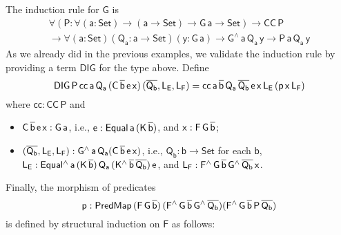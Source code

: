 \documentclass[acmsmall,screen,review,anonymous]{acmart}
\theoremstyle{definition}
\begin{document}
The induction rule for $\mathsf{G}$ is
\begin{multline*}
\mathsf{\forall (P : \forall (a : Set) \to (a \to Set) \to G\,a \to Set) \to CC\,P} \\
\mathsf{\to \forall (a : Set)(Q_a : a \to Set)(y : G\,a) \to G^{\wedge}\,a\,Q_a\,y \to P\,a\,Q_a\,y}
\end{multline*}
As we already did in the previous examples,
we validate the induction rule by providing a term $\mathsf{DIG}$ for the type above.
Define
\[
\mathsf{DIG\,P\,cc\,a\,Q_a\,(C\,\overline{b}\,e\,x)\,(\overline{Q_b}, L_E, L_F)
= cc\,a\,\overline{b}\,Q_a\,\overline{Q_b}\,e\,x\,L_E\,(p\,x\,L_F)}
\]
where $\mathsf{cc : CC\,P}$ and
\begin{itemize}
\item $\mathsf{C\,\overline{b}\,e\,x : G\,a}$,
i.e., $\mathsf{e : Equal\,a\,(K\,\overline{b})}$,
and $\mathsf{x : F\,G\,\overline{b}}$;
\item $\mathsf{(\overline{Q_b}, L_E, L_F) : G^{\wedge}\,a\,Q_a (C\,\overline{b}\,e\,x)}$,
i.e.,
$\mathsf{Q_b : b \to Set}$ for each $\mathsf{b}$,
$\mathsf{L_E : Equal^{\wedge}\,a\,(K\,\overline{b})\,Q_a\,(K^{\wedge}\,\overline{b}\,\overline{Q_b})\,e}$,
and $\mathsf{L_F : F^{\wedge}\,G\,\overline{b}\,G^{\wedge}\,{\overline{Q_b}}\,x}$.
\end{itemize}
Finally, the morphism of predicates
\[
\mathsf{p : PredMap\,(F\,G\,\overline{b})\,(F^{\wedge}\,G\,\overline{b}\,G^{\wedge}\,\overline{Q_b}) (F^{\wedge}\,G\,\overline{b}\,P\,\overline{Q_b})}
\]
is defined by structural induction on $\mathsf{F}$ as follows:
\end{document}
